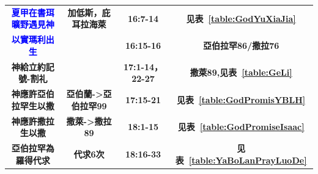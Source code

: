 \begin{table}[H]
\begin{threeparttable}
\begin{tabular}{c c c c}
\multicolumn{1}{L{\dimexpr0.25\linewidth-1\tabcolsep\relax}}{\bfseries \textcolor{blue}{夏甲在書珥曠野遇見神}}  
& \multicolumn{1}{L{\dimexpr0.2\linewidth-1\tabcolsep\relax}}{\bfseries 加低斯，庇耳拉海萊} 
& \multicolumn{1}{L{\dimexpr0.1\linewidth-1\tabcolsep\relax}}{\bfseries 16:7-14}
& \multicolumn{1}{L{\dimexpr0.2\linewidth-1\tabcolsep\relax}}{\bfseries 见表~\ref{table:GodYuXiaJia}}\\

\multicolumn{1}{L{\dimexpr0.25\linewidth-1\tabcolsep\relax}}{\bfseries \textcolor{blue}{以實瑪利出生}}
& \multicolumn{1}{L{\dimexpr0.2\linewidth-1\tabcolsep\relax}}{\bfseries }   
& \multicolumn{1}{L{\dimexpr0.1\linewidth-1\tabcolsep\relax}}{\bfseries 16:15-16}
& \multicolumn{1}{L{\dimexpr0.2\linewidth-1\tabcolsep\relax}}{\bfseries 亞伯拉罕86/撒拉76}\\

\multicolumn{1}{L{\dimexpr0.25\linewidth-1\tabcolsep\relax}}{\bfseries 神給立約記號-割礼} 
& \multicolumn{1}{L{\dimexpr0.3\linewidth-1\tabcolsep\relax}}{\bfseries }  
& \multicolumn{1}{L{\dimexpr0.2\linewidth-1\tabcolsep\relax}}{\bfseries 17:1-14，22-27}
& \multicolumn{1}{L{\dimexpr0.2\linewidth-1\tabcolsep\relax}}{\bfseries 撒萊89,见表~\ref{table:GeLi}}\\

\multicolumn{1}{L{\dimexpr0.25\linewidth-1\tabcolsep\relax}}{\bfseries 神應許亞伯拉罕生以撒} 
& \multicolumn{1}{L{\dimexpr0.25\linewidth-1\tabcolsep\relax}}{\bfseries 亞伯蘭->亞伯拉罕99}  
& \multicolumn{1}{L{\dimexpr0.1\linewidth-1\tabcolsep\relax}}{\bfseries 17:15-21}
& \multicolumn{1}{L{\dimexpr0.2\linewidth-1\tabcolsep\relax}}{\bfseries 见表~\ref{table:GodPromisYBLH}}\\

\multicolumn{1}{L{\dimexpr0.25\linewidth-1\tabcolsep\relax}}{\bfseries 神應許撒拉生以撒} 
& \multicolumn{1}{L{\dimexpr0.2\linewidth-1\tabcolsep\relax}}{\bfseries 撒萊->撒拉89}  
& \multicolumn{1}{L{\dimexpr0.1\linewidth-1\tabcolsep\relax}}{\bfseries 18:1-15}
& \multicolumn{1}{L{\dimexpr0.2\linewidth-1\tabcolsep\relax}}{\bfseries 见表~\ref{table:GodPromiseIsaac}}\\

\multicolumn{1}{L{\dimexpr0.25\linewidth-1\tabcolsep\relax}}{\bfseries 亞伯拉罕為羅得代求}  
& \multicolumn{1}{L{\dimexpr0.2\linewidth-1\tabcolsep\relax}}{\bfseries 代求6次} 
& \multicolumn{1}{L{\dimexpr0.1\linewidth-1\tabcolsep\relax}}{\bfseries 18:16-33}
& \multicolumn{1}{L{\dimexpr0.2\linewidth-1\tabcolsep\relax}}{\bfseries 见表~\ref{table:YaBoLanPrayLuoDe}}\\


\end{tabular}
\end{threeparttable}
\end{table}
